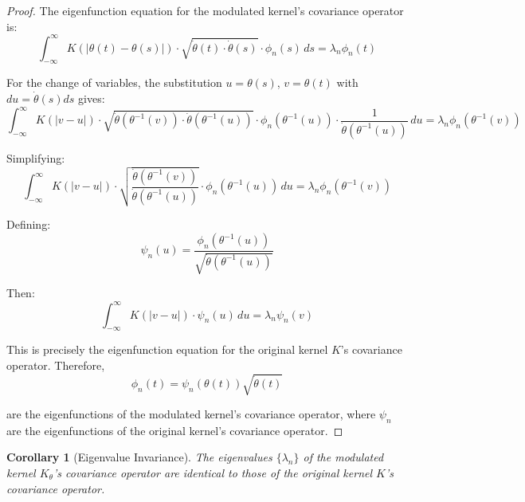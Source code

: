 \documentclass{article}
\newtheorem{corollary}[theorem]{Corollary}
\newcommand{\dottheta}{\dot{\theta}}
\begin{document}
\begin{proof}
The eigenfunction equation for the modulated kernel's covariance operator is:
\begin{equation}
\int_{-\infty}^{\infty} K(|\theta(t)-\theta(s)|) \cdot \sqrt{\dottheta(t) \cdot \dottheta(s)} \cdot \phi_n(s) \, ds = \lambda_n \phi_n(t)
\end{equation}

For the change of variables, the substitution $u=\theta(s)$, $v=\theta(t)$ with $du = \dottheta(s)ds$ gives:
\begin{equation}
\int_{-\infty}^{\infty} K(|v-u|) \cdot \sqrt{\dottheta(\theta^{-1}(v)) \cdot \dottheta(\theta^{-1}(u))} \cdot \phi_n(\theta^{-1}(u)) \cdot \frac{1}{\dottheta(\theta^{-1}(u))} \, du = \lambda_n \phi_n(\theta^{-1}(v))
\end{equation}

Simplifying:
\begin{equation}
\int_{-\infty}^{\infty} K(|v-u|) \cdot \sqrt{\frac{\dottheta(\theta^{-1}(v))}{\dottheta(\theta^{-1}(u))}} \cdot \phi_n(\theta^{-1}(u)) \, du = \lambda_n \phi_n(\theta^{-1}(v))
\end{equation}

Defining:
\begin{equation}
\psi_n(u) = \frac{\phi_n(\theta^{-1}(u))}{\sqrt{\dottheta(\theta^{-1}(u))}}
\end{equation}

Then:
\begin{equation}
\int_{-\infty}^{\infty} K(|v-u|) \cdot \psi_n(u) \, du = \lambda_n \psi_n(v)
\end{equation}

This is precisely the eigenfunction equation for the original kernel $K$'s covariance operator. Therefore,
\begin{equation}
\phi_n(t) = \psi_n(\theta(t))\sqrt{\dottheta(t)}
\end{equation}

are the eigenfunctions of the modulated kernel's covariance operator, where $\psi_n$ are the eigenfunctions of the original kernel's covariance operator.
\end{proof}

\begin{corollary}[Eigenvalue Invariance]
The eigenvalues $\{\lambda_n\}$ of the modulated kernel $K_\theta$'s covariance operator are identical to those of the original kernel $K$'s covariance operator.
\end{corollary}
\end{document}
